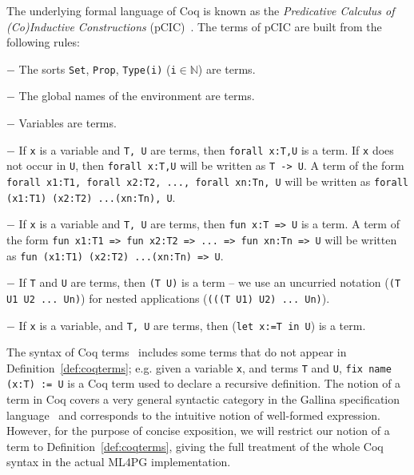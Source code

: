 The underlying formal language of Coq is known as the \emph{Predicative Calculus of (Co)Inductive Constructions} (pCIC)~\cite{Coq,CoquandH88,CoPa89}. %
The terms of pCIC are built from
the following rules:


\begin{definition}\label{def:coqterms}

$-$ The sorts \lstinline?Set?, \lstinline?Prop?, \lstinline?Type(i)? (\lstinline?i?$\in \mathbb{N}$) are terms.

$-$ The global names of the environment are terms. 

$-$ Variables are terms.
 
$-$ If \lstinline?x? is a variable and \lstinline?T, U? are terms, then \lstinline?forall x:T,U? 
 is a term. If \lstinline?x? does not occur in \lstinline?U?, then \lstinline?forall x:T,U? will be written as \lstinline?T -> U?. A term of the 
 form \lstinline?forall x1:T1, forall x2:T2, ..., forall xn:Tn, U? will be written as \lstinline?forall (x1:T1) (x2:T2) ...(xn:Tn), U?. 
 
$-$ If \lstinline?x? is a variable and \lstinline?T, U? are terms, then \lstinline?fun x:T => U? 
 is a term. A term of the form \lstinline?fun x1:T1 => fun x2:T2 => ... => fun xn:Tn => U? will be written as \lstinline?fun (x1:T1) (x2:T2) ...(xn:Tn) => U?. 

 $-$ If \lstinline?T? and \lstinline?U? are terms, then \lstinline?(T U)? is a term -- we use an uncurried notation (\lstinline?(T U1 U2 ... Un)?) 
 for nested applications (\lstinline?(((T U1) U2) ... Un)?).
 
 $-$ If \lstinline?x? is a variable, and \lstinline?T, U? are terms, then (\lstinline?let x:=T in U?) is a term.

\end{definition}

The syntax of Coq terms~\cite{Coq} includes some terms that do not appear in Definition~\ref{def:coqterms}; e.g. given 
 a variable \lstinline?x?, and  terms \lstinline?T? and \lstinline?U?, \lstinline?fix name (x:T) := U? is a Coq term used to declare a recursive definition.
The notion of a term in Coq covers a very general syntactic
category in the Gallina specification language~\cite{Coq} and corresponds to the intuitive notion of well-formed expression. 
However, for the purpose of concise exposition, %
we will restrict our notion of a term to Definition~\ref{def:coqterms},
giving the full treatment of the whole Coq syntax in the actual ML4PG implementation.


